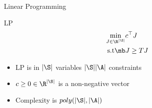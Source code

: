 \documentclass[handout,10pt]{beamer}
\begin{document}
\begin{frame}[fragile]{Linear Programming}
\begin{block}{LP \cite{BertB}}
\begin{align*}
\min_{J\in \R^{|\S|}} &c^\top J\\
\text{s.t}\mb &J\geq T J
\end{align*}
\end{block}

\begin{itemize}
\item LP is in $|\S|$ variables $|\S||\A|$ constraints
\item $c\geq 0 \in \R^{|\S|}$ is a non-negative vector
\item Complexity is $poly(|\S|,|\A|)$
\end{itemize}
\end{frame}


\begin{comment}
\begin{frame}[fragile]{Definitions}
\begin{block}{Norms}
For $\psi>0\in \R^{|\S|}$, $\norm{\cdot}_{\infty,\psi}=\max_{s\in \S}\frac{(\cdot)(s) }{\psi(s)}$
\end{block}


\begin{block}{Superharomic}
$f\in \R^{|\S|}$ is superharmonic to $g$ if $f\geq g$
\end{block}


\begin{block}{Maximal Inflation}
$\psi>0\in \R^{|\S|}$ then
\begin{align*}
\beta_\psi=\max_{a\in \A}\frac{\alpha p_a(s,\cdot)^\top \psi}{\psi(s)}
\end{align*}
\end{block}

\begin{block}{Lyapunov}
$\psi$ is a Lyapunov function if $\beta_\psi<1$
\end{block}

\end{frame}
\end{comment}
\end{document}
